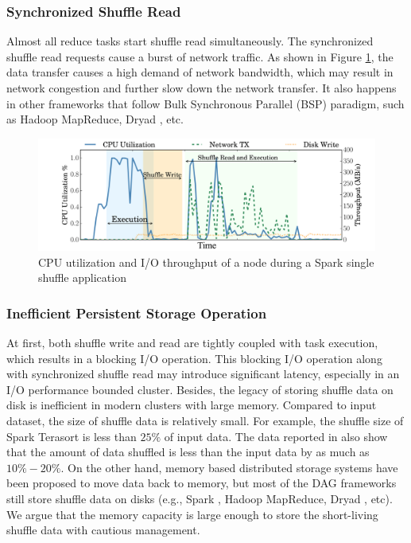 \subsubsection{Synchronized Shuffle Read}
Almost all reduce tasks start shuffle read simultaneously. 
The synchronized shuffle read requests cause a burst of network traffic. 
As shown in Figure \ref{fig:util}, 
the data transfer causes a high demand of network bandwidth, which may result in network congestion and further slow down the network transfer.
It also happens in other frameworks that follow Bulk Synchronous Parallel (BSP) paradigm, such as Hadoop MapReduce, Dryad \cite{dryad}, etc.
\begin{figure}
	\includegraphics[width=\linewidth]{fig/util}
	\caption{CPU utilization and I/O throughput of a node during a Spark single shuffle application}
	\label{fig:util}
	\vspace{-1em}
\end{figure}

\subsubsection{Inefficient Persistent Storage Operation}
At first, both shuffle write and read are tightly coupled with task execution, which results in a blocking I/O operation. 
This blocking I/O operation along with synchronized shuffle read may introduce significant latency, especially in an I/O performance bounded cluster.
Besides, the legacy of storing shuffle data on disk is inefficient in modern clusters with large memory. 
Compared to input dataset, the size of shuffle data is relatively small. 
For example, the shuffle size of Spark Terasort is less than $25\%$ of input data. 
The data reported in \cite{makingsense} also show that the amount of data shuffled is less than the input data by as much as $10\%-20\%$. 
On the other hand, memory based distributed storage systems have been proposed \cite{memcached, tachyon, ramcloud} to move data back to memory, 
but most of the DAG frameworks still store shuffle data on disks (e.g., Spark \cite{apachespark}, Hadoop MapReduce, Dryad \cite{dryad}, etc).
We argue that the memory capacity is large enough to store the short-living shuffle data with cautious management.

